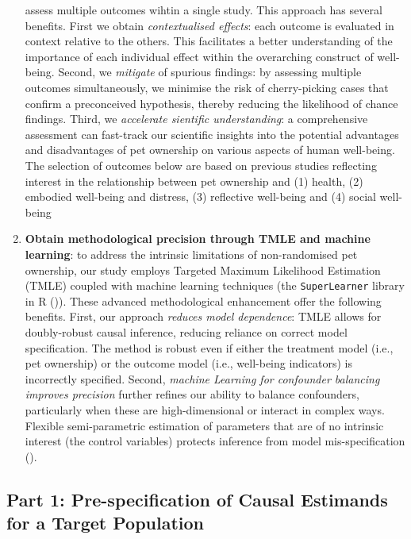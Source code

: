 \documentclass[
  singlecolumn]{article}
\begin{document}
\begin{enumerate}
  assess multiple outcomes wihtin a single study. This approach has
  several benefits. First we obtain \emph{contextualised effects}: each
  outcome is evaluated in context relative to the others. This
  facilitates a better understanding of the importance of each
  individual effect within the overarching construct of well-being.
  Second, we \emph{mitigate} of spurious findings: by assessing multiple
  outcomes simultaneously, we minimise the risk of cherry-picking cases
  that confirm a preconceived hypothesis, thereby reducing the
  likelihood of chance findings. Third, we \emph{accelerate sientific
  understanding}: a comprehensive assessment can fast-track our
  scientific insights into the potential advantages and disadvantages of
  pet ownership on various aspects of human well-being. The selection of
  outcomes below are based on previous studies reflecting interest in
  the relationship between pet ownership and (1) health, (2) embodied
  well-being and distress, (3) reflective well-being and (4) social
  well-being
\item
  \textbf{Obtain methodological precision through TMLE and machine
  learning}: to address the intrinsic limitations of non-randomised pet
  ownership, our study employs Targeted Maximum Likelihood Estimation
  (TMLE) coupled with machine learning techniques (the
  \texttt{SuperLearner} library in R ()). These advanced methodological enhancement offer
  the following benefits. First, our approach \emph{reduces model
  dependence}: TMLE allows for doubly-robust causal inference, reducing
  reliance on correct model specification. The method is robust even if
  either the treatment model (i.e., pet ownership) or the outcome model
  (i.e., well-being indicators) is incorrectly specified. Second,
  \emph{machine Learning for confounder balancing improves precision}
  further refines our ability to balance confounders, particularly when
  these are high-dimensional or interact in complex ways. Flexible
  semi-parametric estimation of parameters that are of no intrinsic
  interest (the control variables) protects inference from model
  mis-specification ().
\end{enumerate}

\subsection{Part 1: Pre-specification of Causal Estimands for a Target
Population}\label{part-1-pre-specification-of-causal-estimands-for-a-target-population}
\end{document}
